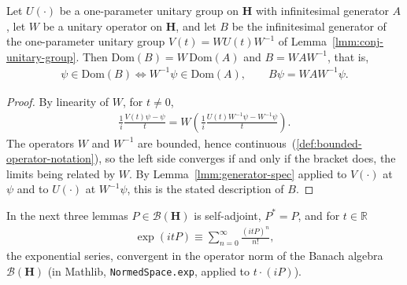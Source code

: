 \begin{lemma}
    \label{lmm:generator-conj}
    \leanok
    Let $U(\cdot)$ be a one-parameter unitary group on $\mathbf{H}$ with infinitesimal generator $A$, let $W$ be a unitary operator on $\mathbf{H}$, and let $B$ be the infinitesimal generator of the one-parameter unitary group $V(t) = WU(t)W^{-1}$ of Lemma~\ref{lmm:conj-unitary-group}. Then $\text{Dom}(B) = W\,\text{Dom}(A)$ and $B = WAW^{-1}$, that is,
    \begin{align}
        \psi \in \text{Dom}(B) \iff W^{-1}\psi \in \text{Dom}(A), \qquad B\psi = WAW^{-1}\psi.
    \end{align}
\end{lemma}
\begin{proof}
    \leanok
    By linearity of $W$, for $t \ne 0$,
    \begin{align}
        \frac{1}{i}\frac{V(t)\psi - \psi}{t} = W\left( \frac{1}{i}\frac{U(t)W^{-1}\psi - W^{-1}\psi}{t} \right).
    \end{align}
    The operators $W$ and $W^{-1}$ are bounded, hence continuous~(\ref{def:bounded-operator-notation}), so the left side converges if and only if the bracket does, the limits being related by $W$. By Lemma~\ref{lmm:generator-spec} applied to $V(\cdot)$ at $\psi$ and to $U(\cdot)$ at $W^{-1}\psi$, this is the stated description of $B$.
\end{proof}

In the next three lemmas $P \in \mathcal{B}(\mathbf{H})$ is self-adjoint, $P^* = P$, and for $t \in \mathbb{R}$
\begin{align}
    \exp(itP) \equiv \sum_{n=0}^{\infty} \frac{(itP)^n}{n!},
\end{align}
the exponential series, convergent in the operator norm of the Banach algebra $\mathcal{B}(\mathbf{H})$ (in Mathlib, \texttt{NormedSpace.exp}, applied to $t \cdot (iP)$).

